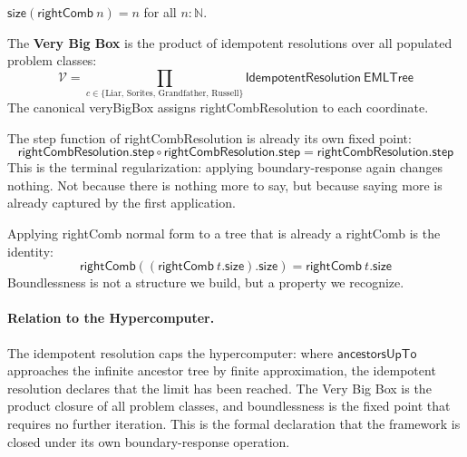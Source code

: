 \begin{theorem}
\label{thm:rightcomb_size_boundlessness}
\leanok
{}
$\mathsf{size}(\mathsf{rightComb}\ n) = n$ for all $n : \mathbb{N}$.
\end{theorem}

\begin{definition}
\label{def:very_big_box}
\leanok
{}
The \textbf{Very Big Box} is the product of idempotent resolutions over all
populated problem classes:
\[
\mathcal{V} = \prod_{c \in \{\text{Liar, Sorites, Grandfather, Russell}\}}
\mathsf{IdempotentResolution}\ \mathsf{EMLTree}
\]
The canonical \textsf{veryBigBox} assigns \textsf{rightCombResolution}
to each coordinate.
\end{definition}

\begin{theorem}
\label{thm:rightComb_meta_idemp}
\leanok
{}
The step function of \textsf{rightCombResolution} is already its own fixed
point:
\[
\mathsf{rightCombResolution.step} \circ \mathsf{rightCombResolution.step}
= \mathsf{rightCombResolution.step}
\]
This is the terminal regularization: applying boundary-response again
changes nothing. Not because there is nothing more to say, but because
saying more is already captured by the first application.
\end{theorem}

\begin{theorem}
\label{thm:rightComb_limit_idemp}
\leanok
{}
Applying \textsf{rightComb} normal form to a tree that is already a
\textsf{rightComb} is the identity:
\[
\mathsf{rightComb}((\mathsf{rightComb}\ t.\mathsf{size}).\mathsf{size}) = \mathsf{rightComb}\ t.\mathsf{size}
\]
Boundlessness is not a structure we build, but a property we recognize.
\end{theorem}

\paragraph{Relation to the Hypercomputer.}
The idempotent resolution caps the hypercomputer: where $\mathsf{ancestorsUpTo}$
approaches the infinite ancestor tree by finite approximation,
the idempotent resolution declares that the limit has been reached.
The Very Big Box is the product closure of all problem classes, and
boundlessness is the fixed point that requires no further iteration.
This is the formal declaration that the framework is closed under its
own boundary-response operation.
